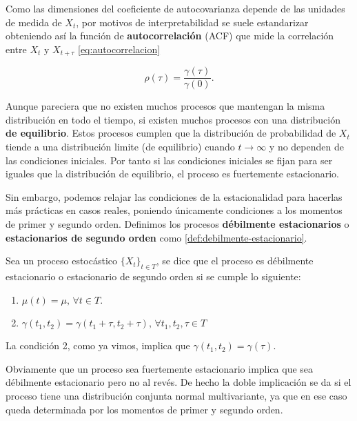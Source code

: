 Como las dimensiones del coeficiente de autocovarianza depende de las unidades de medida de $X_t$, por motivos de interpretabilidad se suele estandarizar obteniendo así la función de \textbf{autocorrelación} (ACF) que mide la correlación entre $X_t$ y $X_{t + \tau}$ \eqref{eq:autocorrelacion}

\begin{equation}
  \rho(\tau) = \dfrac{\gamma(\tau)}{\gamma(0)}.
  \label{eq:autocorrelacion}
\end{equation}

Aunque pareciera que no existen muchos procesos que mantengan la misma distribución en todo el tiempo, si existen muchos procesos con una distribución \textbf{de equilibrio}. Estos procesos cumplen que la distribución de probabilidad de $X_t$ tiende a una distribución limite (de equilibrio) cuando $t \to \infty$ y no dependen de las condiciones iniciales. Por tanto si las condiciones iniciales se fijan para ser iguales que la distribución de equilibrio, el proceso es fuertemente estacionario.

Sin embargo, podemos relajar las condiciones de la estacionalidad para hacerlas más prácticas en casos reales, poniendo únicamente condiciones a los momentos de primer y segundo orden. Definimos los procesos \textbf{débilmente estacionarios} o \textbf{estacionarios de segundo orden} como \autoref{def:debilmente-estacionario}.

\begin{definicion}
  Sea un proceso estocástico $\{X_t\}_{t \in T}$, se dice que el proceso es débilmente estacionario o estacionario de segundo orden si se cumple lo siguiente:

  \begin{enumerate}
    \item $\mu(t) = \mu, \, \forall t \in T$.
    \item $\gamma(t_1, t_2) = \gamma  (t_1 + \tau, t_2 + \tau), \, \forall t_1, t_2, \tau \in T$
  \end{enumerate}

  La condición 2, como ya vimos, implica que $\gamma(t_1, t_2) = \gamma(\tau)$.
  \label{def:debilmente-estacionario}
\end{definicion}

Obviamente que un proceso sea fuertemente estacionario implica que sea débilmente estacionario pero no al revés. De hecho la doble implicación se da si el proceso tiene una distribución conjunta normal multivariante, ya que en ese caso queda determinada por los momentos de primer y segundo orden.

